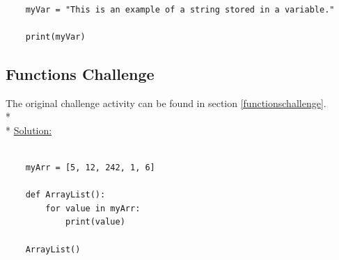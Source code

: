 \documentclass[12pt, letterpaper]{article}
\begin{document}
    \begin{verbatim}
    
    myVar = "This is an example of a string stored in a variable."

    print(myVar)

    \end{verbatim}

    \subsection{Functions Challenge} \label{functionsol}

    The original challenge activity can be found in section \ref{functionschallenge}. \\* \\*
    \underline{Solution:}

    \begin{verbatim}

    myArr = [5, 12, 242, 1, 6]

    def ArrayList():
        for value in myArr:
            print(value)
    
    ArrayList()
    
    \end{verbatim}
\end{document}
